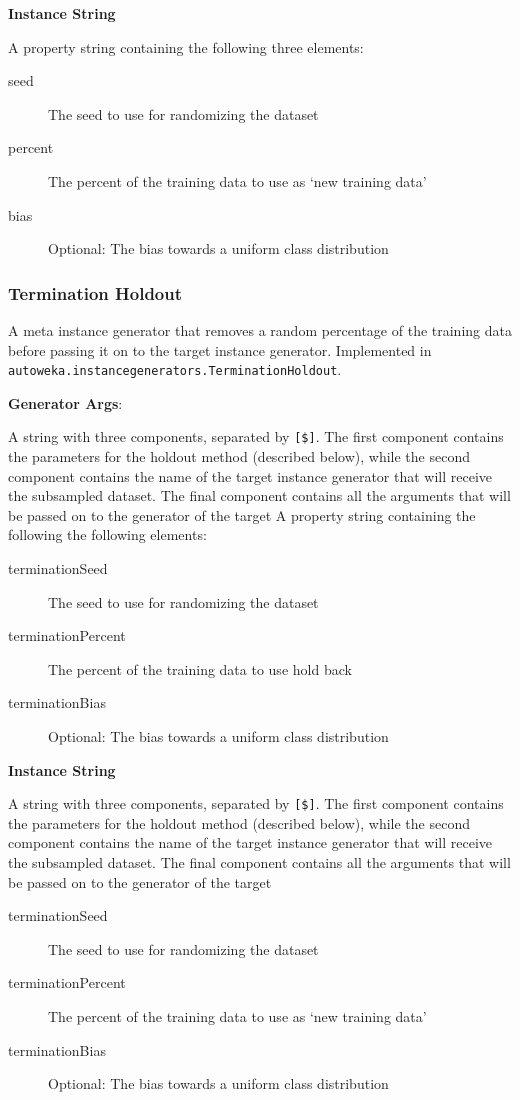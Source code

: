 \textbf{Instance String}
\begin{tabover}
A property string containing the following three elements:
\begin{description}
 \item [seed] The seed to use for randomizing the dataset
 \item [percent] The percent of the training data to use as `new training data'
 \item [bias] Optional: The bias towards a uniform class distribution
\end{description}
\end{tabover}

\subsubsection{Termination Holdout}

A meta instance generator that removes a random percentage of the training data before passing it on to the target instance generator. Implemented in \texttt{autoweka.instancegenerators.TerminationHoldout}. 

\textbf{Generator Args}:
\begin{tabover}
A string with three components, separated by \texttt{[\$]}. The first component contains the parameters for the holdout method (described below), while the second component contains the name of the target instance generator that will receive the subsampled dataset. The final component contains all the arguments that will be passed on to the generator of the target 
A property string containing the following the following elements:
\begin{description}
 \item [terminationSeed] The seed to use for randomizing the dataset
 \item [terminationPercent] The percent of the training data to use hold back
 \item [terminationBias] Optional: The bias towards a uniform class distribution
\end{description}
\end{tabover}

\textbf{Instance String}
\begin{tabover}
A string with three components, separated by \texttt{[\$]}. The first component contains the parameters for the holdout method (described below), while the second component contains the name of the target instance generator that will receive the subsampled dataset. The final component contains all the arguments that will be passed on to the generator of the target 
\begin{description}
 \item [terminationSeed] The seed to use for randomizing the dataset
 \item [terminationPercent] The percent of the training data to use as `new training data'
 \item [terminationBias] Optional: The bias towards a uniform class distribution
\end{description}
\end{tabover}

